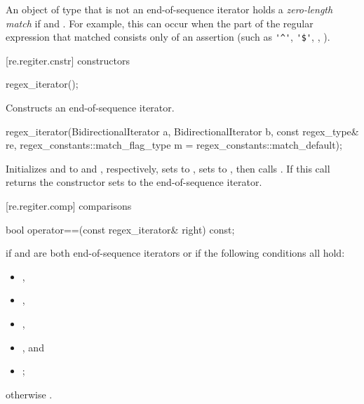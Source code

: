 \pnum
{}%
An object of type  that is not an end-of-sequence iterator
holds a \textit{zero-length match} if  and
. \enternote For
example, this can occur when the part of the regular expression that
matched consists only of an assertion (such as \verb|'^'|, \verb|'$'|, 
, ). \exitnote

[re.regiter.cnstr]{ constructors}

%
\begin{itemdecl}
regex_iterator(); 
\end{itemdecl}

\begin{itemdescr}
\pnum\effects  Constructs an end-of-sequence iterator.
\end{itemdescr}

%
\begin{itemdecl}
regex_iterator(BidirectionalIterator a, BidirectionalIterator b, 
               const regex_type& re, 
               regex_constants::match_flag_type m = regex_constants::match_default); 
\end{itemdecl}

\begin{itemdescr}
\pnum\effects  Initializes  and  to
 and , respectively, sets
 to , sets  to
, then calls . If this
call returns  the constructor sets  to the end-of-sequence
iterator.
\end{itemdescr}

[re.regiter.comp]{ comparisons}

%
%
\begin{itemdecl}
bool operator==(const regex_iterator& right) const;
\end{itemdecl}

\begin{itemdescr}
\pnum
\returns  {} if  and  are both end-of-sequence
iterators or if the following conditions all hold:
\begin{itemize}
\item {},
\item {},
\item {},
\item {}, and
\item {};
\end{itemize}
otherwise .
\end{itemdescr}

